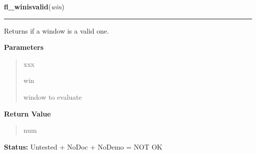 \hspace{.8\funcindent}\begin{boxedminipage}{\funcwidth}

    \raggedright \textbf{fl\_winisvalid}(\textit{win})

    \vspace{-1.5ex}

    \rule{\textwidth}{0.5\fboxrule}
\setlength{\parskip}{2ex}
    Returns if a window is a valid one.

\setlength{\parskip}{1ex}
      \textbf{Parameters}
      \vspace{-1ex}

      \begin{quote}
        \begin{Ventry}{xxx}

          \item[win]

          window to evaluate

        \end{Ventry}

      \end{quote}

      \textbf{Return Value}
    \vspace{-1ex}

      \begin{quote}
      num

      \end{quote}

\textbf{Status:} Untested + NoDoc + NoDemo = NOT OK



    \end{boxedminipage}

    \label{xformslib:library:fl_wintitle}

    \vspace{0.5ex}

